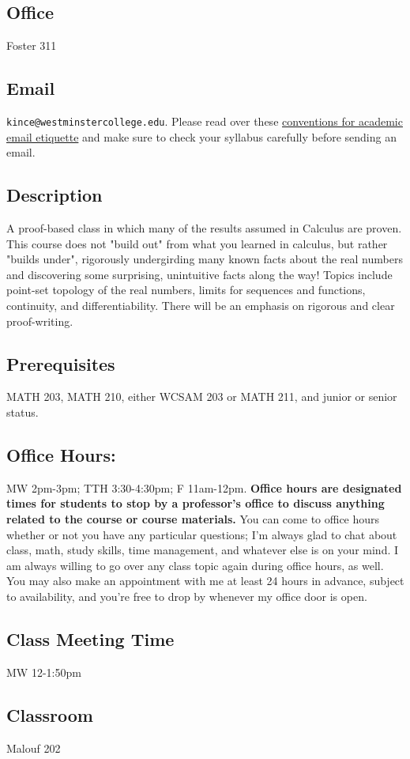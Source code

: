 \documentclass[11pt, a4paper]{article}
\begin{document}
\subsection*{Office} Foster 311
\subsection*{Email} {\tt kince@westminstercollege.edu}. Please read over these \href{https://owl.english.purdue.edu/owl/resource/694/01/}{conventions for academic email etiquette} and make sure to check your syllabus carefully before sending an email.
\subsection*{Description} A proof-based class in which many of the results assumed in Calculus are proven. This course does not "build out" from what you learned in calculus, but rather "builds under", rigorously undergirding many known facts about the real numbers and discovering some surprising, unintuitive facts along the way! Topics include point-set topology of the real numbers, limits for sequences and functions, continuity, and differentiability. There will be an emphasis on rigorous and clear proof-writing.
\subsection*{Prerequisites} MATH 203, MATH 210, either WCSAM 203 or MATH 211, and junior or senior status.
\subsection*{Office Hours:} MW 2pm-3pm; TTH 3:30-4:30pm; F 11am-12pm. \textbf{Office hours are designated times for students to stop by a professor's office to discuss anything related to the course or course materials.} You can come to office hours whether or not you have any particular questions; I'm always glad to chat about class, math, study skills, time management, and whatever else is on your mind. I am always willing to go over any class topic again during office hours, as well. You may also make an appointment with me at least 24 hours in advance, subject to availability, and you're free to drop by whenever my office door is open.
\subsection*{Class Meeting Time} MW 12-1:50pm
\subsection*{Classroom} Malouf 202
\end{document}

